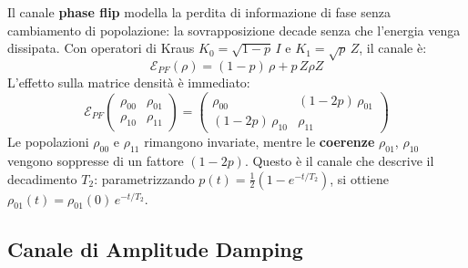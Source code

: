 Il canale \textbf{phase flip} modella la perdita di informazione di fase senza cambiamento di popolazione: la sovrapposizione decade senza che l'energia venga dissipata. Con operatori di Kraus $K_0 = \sqrt{1-p}\,I$ e $K_1 = \sqrt{p}\,Z$, il canale è:
\begin{equation}
    \mathcal{E}_{PF}(\rho) = (1-p)\,\rho + p\,Z\rho Z
    \label{eq:phaseflip}
\end{equation}
L'effetto sulla matrice densità è immediato:
\begin{equation}
    \mathcal{E}_{PF}\!\begin{pmatrix}\rho_{00} & \rho_{01} \\ \rho_{10} & \rho_{11}\end{pmatrix}
    = \begin{pmatrix}\rho_{00} & (1-2p)\,\rho_{01} \\ (1-2p)\,\rho_{10} & \rho_{11}\end{pmatrix}
\end{equation}
Le popolazioni $\rho_{00}$ e $\rho_{11}$ rimangono invariate, mentre le \textbf{coerenze} $\rho_{01}$, $\rho_{10}$ vengono soppresse di un fattore $(1-2p)$. Questo è il canale che descrive il decadimento $T_2$: parametrizzando $p(t) = \frac{1}{2}(1-e^{-t/T_2})$, si ottiene $\rho_{01}(t) = \rho_{01}(0)\,e^{-t/T_2}$.

\subsection{Canale di Amplitude Damping}

